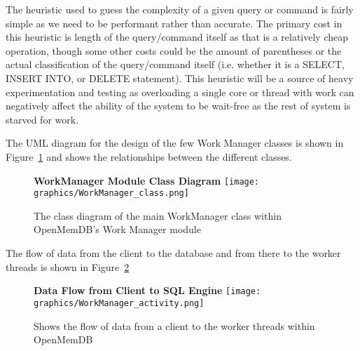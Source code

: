 \documentclass[letterpaper, 11pt]{article}
\begin{document}
  The heuristic used to guess the complexity of a given query or command is fairly simple as we need to
  be performant rather than accurate. The primary cost in this heuristic is length of the query/command itself
  as that is a relatively cheap operation, though some other costs could be the amount of parentheses
  or the actual classification of the query/command itself (i.e. whether it is a SELECT, INSERT INTO, or DELETE statement).
  This heuristic will be a source of heavy experimentation and testing as overloading a single core or thread
  with work can negatively affect the ability of the system to be wait-free as the rest of system is
  starved for work.
  \par\vspace{\baselineskip}
  The UML diagram for the design of the few Work Manager classes is shown in Figure~\ref{fig:work_manager_class}
  and shows the relationships between the different classes.
  
  \begin{figure}[H]
   \centering
   \textbf{WorkManager Module Class Diagram}
   \texttt{[image: graphics/WorkManager\_class.png]}
   \caption{The class diagram of the main WorkManager class within OpenMemDB's Work Manager module}
   \label{fig:work_manager_class}
  \end{figure}

  The flow of data from the client to the database and from there to the worker threads
  is shown in Figure~\ref{fig:work_manager_activity}
  \begin{figure}[H]
   \centering
   \textbf{Data Flow from Client to SQL Engine}
   \texttt{[image: graphics/WorkManager\_activity.png]}
   \caption{Shows the flow of data from a client to the worker threads within OpenMemDB}
   \label{fig:work_manager_activity}
  \end{figure}

\newpage
\end{document}
